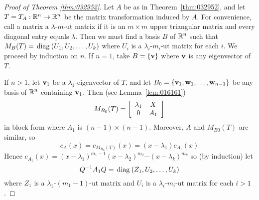 \begin{proof}[Proof of Theorem \ref{thm:032952}]
Let $A$ be as in Theorem~\ref{thm:032952}, and let $T = T_{A} : \mathbb{R}^n \to \mathbb{R}^n$ be the matrix transformation induced by $A$. For convenience, call a matrix a $\lambda$-$m$-ut matrix if it is an $m \times m$ upper triangular matrix and every diagonal entry equals $\lambda$. Then we must find a basis $B$ of $\mathbb{R}^n$ such that $M_{B}(T) = \thinspace\operatorname{diag\medspace}(U_{1}, U_{2}, \dots, U_{k})$ where $U_{i}$ is a $\lambda_{i}$-$m_{i}$-ut matrix for each $i$. We proceed by induction on $n$. If $n = 1$, take $B = \{\textbf{v}\}$ where $\textbf{v}$ is any eigenvector of $T$.


If $n > 1$, let $\textbf{v}_{1}$ be a $\lambda_{1}$-eigenvector of $T$, and let $B_{0} = \{\textbf{v}_{1}, \textbf{w}_{1}, \dots, \textbf{w}_{n-1}\}$ be any basis of $\mathbb{R}^n$ containing $\textbf{v}_{1}$. Then (see Lemma~\ref{lem:016161})
\begin{equation*}
M_{B_0}(T) = \left[ \begin{array}{cc}
\lambda_1 & X \\
0 & A_1
\end{array} \right]
\end{equation*}
in block form where $A_{1}$ is $(n - 1) \times (n - 1)$. Moreover, $A$ and $M_{B0}(T)$ are similar, so
\begin{equation*}
c_A(x) = c_{M_{B_0}(T)}(x) = (x - \lambda_1)c_{A_1}(x)
\end{equation*}
Hence $c_{A_1}(x) = (x - \lambda_1)^{m_{1}-1} (x - \lambda_2)^{m_2} \cdots (x - \lambda_k)^{m_k}$
 so (by induction) let
\begin{equation*}
Q^{-1}A_{1}Q = \thinspace\operatorname{diag\medspace}(Z_1,U_2,\dots,U_k)
\end{equation*}
where $Z_{1}$ is a $\lambda_{1}$-$(m_{1}-1)$-ut matrix and $U_{i}$ is a $\lambda_{i}$-$m_{i}$-ut matrix for each $i > 1$.



\end{proof}
